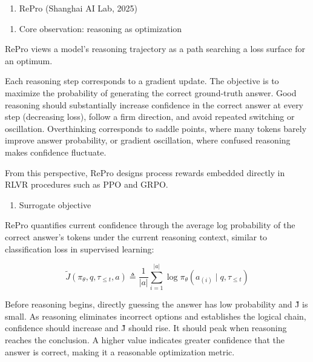 \begin{enumerate}
\def\labelenumi{\arabic{enumi}.}
\setcounter{enumi}{1}
\tightlist
\item
  RePro (Shanghai AI Lab, 2025)
\end{enumerate}

\begin{enumerate}
\def\labelenumi{(\arabic{enumi})}
\tightlist
\item
  Core observation: reasoning as optimization
\end{enumerate}

RePro views a model's reasoning trajectory as a path searching a loss surface for an optimum.

Each reasoning step corresponds to a gradient update. The objective is to maximize the probability of generating the correct ground-truth answer. Good reasoning should substantially increase confidence in the correct answer at every step (decreasing loss), follow a firm direction, and avoid repeated switching or oscillation. Overthinking corresponds to saddle points, where many tokens barely improve answer probability, or gradient oscillation, where confused reasoning makes confidence fluctuate.

From this perspective, RePro designs process rewards embedded directly in RLVR procedures such as PPO and GRPO.

\begin{enumerate}
\def\labelenumi{(\arabic{enumi})}
\setcounter{enumi}{1}
\tightlist
\item
  Surrogate objective
\end{enumerate}

RePro quantifies current confidence through the average log probability of the correct answer's tokens under the current reasoning context, similar to classification loss in supervised learning:

\[
\tilde{J}(\pi_\theta, q, \tau_{\le t}, a)
\triangleq
\frac{1}{|a|}\sum_{i=1}^{|a|}
\log \pi_\theta(a_{(i)} \mid q, \tau_{\le t})
\]

Before reasoning begins, directly guessing the answer has low probability and J̃ is small. As reasoning eliminates incorrect options and establishes the logical chain, confidence should increase and J̃ should rise. It should peak when reasoning reaches the conclusion. A higher value indicates greater confidence that the answer is correct, making it a reasonable optimization metric.

